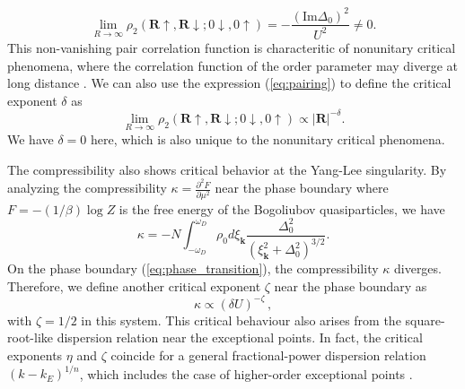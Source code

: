 \documentclass[aps,prl,twocolumn,nofootinbib,superscriptaddress,longbibliography]{revtex4-1}
\begin{document}
	\begin{equation}
	\lim_{R\rightarrow\infty}\rho_{2}(\bm{R}\uparrow,\bm{R}\downarrow;0\downarrow,0\uparrow)=-\frac{(\text{Im}\Delta_{0})^{2}}{U^{2}}\neq0.\label{eq:pairing}
	\end{equation}
	This non-vanishing pair correlation function is characteritic of nonunitary critical phenomena, where the correlation function of the order parameter may diverge at long distance \cite{Fisher:1978vn}. We can also use the expression (\ref{eq:pairing}) to define the critical exponent $\delta$ as
	\begin{equation}
		\lim_{R\rightarrow\infty}\rho_{2}(\bm{R}\uparrow,\bm{R}\downarrow;0\downarrow,0\uparrow)\propto |\bm{R}|^{-\delta}.
	\end{equation}
	We have $\delta=0$ here, which is also unique to the nonunitary critical phenomena.
	
	The compressibility also shows critical behavior at the Yang-Lee singularity. By analyzing the compressibility $\kappa=\frac{\partial^2 F}{\partial \mu^2}$ near the phase boundary where $F=-(1/\beta)\log Z$ is the free energy of the Bogoliubov quasiparticles, we have 
	\begin{equation}
		 \kappa=- N\int_{- \omega_D}^{\omega_D} \rho_0 d\xi_{\bm{k}} \frac{\Delta_0^2}{(\xi_{\bm{k}}^2 + \Delta_0^2)^{3/ 2}}.
	\end{equation}
	On the phase boundary (\ref{eq:phase_transition}), the compressibility $\kappa$ diverges. Therefore, we define another critical exponent $\zeta$ near the phase boundary as
	\begin{equation}
		\kappa\propto(\delta U)^{-\zeta}\,,
	\end{equation}
	with $\zeta=1/2$ in this system. This critical behaviour also arises from the square-root-like dispersion relation near the exceptional points. %
	In fact, the critical exponents $\eta$ and $\zeta$ coincide for a general fractional-power dispersion relation $(k-k_E)^{1/n}$, which includes the case of higher-order exceptional points \cite{SupplementaryMaterial}.
\end{document}
